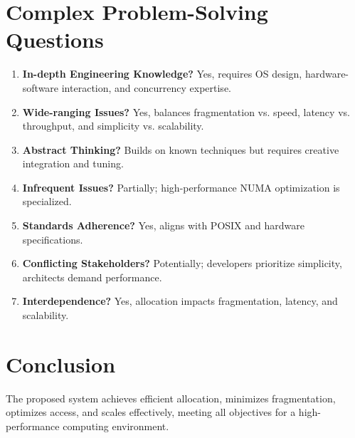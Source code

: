 \documentclass[a4paper,12pt]{article}
\begin{document}
\section{Complex Problem-Solving Questions}
\begin{enumerate}[label=\alph*.]
    \item \textbf{In-depth Engineering Knowledge?} Yes, requires OS design, hardware-software interaction, and concurrency expertise.
    \item \textbf{Wide-ranging Issues?} Yes, balances fragmentation vs. speed, latency vs. throughput, and simplicity vs. scalability.
    \item \textbf{Abstract Thinking?} Builds on known techniques but requires creative integration and tuning.
    \item \textbf{Infrequent Issues?} Partially; high-performance NUMA optimization is specialized.
    \item \textbf{Standards Adherence?} Yes, aligns with POSIX and hardware specifications.
    \item \textbf{Conflicting Stakeholders?} Potentially; developers prioritize simplicity, architects demand performance.
    \item \textbf{Interdependence?} Yes, allocation impacts fragmentation, latency, and scalability.
\end{enumerate}

\section{Conclusion}
The proposed system achieves efficient allocation, minimizes fragmentation, optimizes access, and scales effectively, meeting all objectives for a high-performance computing environment.
\end{document}
